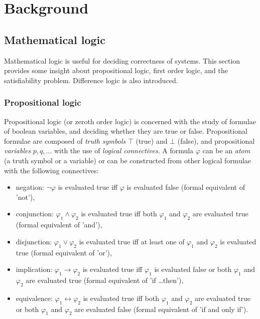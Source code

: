\chapter{Background}
\label{chap:background}


\section{Mathematical logic}

Mathematical logic is useful for deciding correctness of systems. This section provides some insight about propositional logic, first order logic, and the satisfiability problem. Difference logic is also introduced.

\subsection{Propositional logic}

Propositional logic (or zeroth order logic) is concerned with the study of formulae of boolean variables, and deciding whether they are true or false. Propositional formulae are composed of \emph{truth symbols} $\top$ (true) and $\bot$ (false),  and propositional \emph{variables} $p,q, \dots$ with the use of \emph{logical connectives}. A formula $\varphi$ can be an \emph{atom} (a truth symbol or a variable) or can be constructed from other logical formulae with the following connectives:

\begin{itemize}
	\item negation: $\neg\varphi$ is evaluated true iff $\varphi$ is evaluated false (formal equivalent of 'not'),
	\item conjunction: $\varphi_1 \wedge \varphi_2$ is evaluated true iff  both $\varphi_1$ and $\varphi_2$ are evaluated true (formal equivalent of 'and'),
	\item disjunction: $\varphi_1 \vee \varphi_2$ is evaluated true iff  at least one of $\varphi_1$ and $\varphi_2$ is evaluated true (formal equivalent of 'or'),
	\item implication: $\varphi_1 \to \varphi_2$ is evaluated true iff  $\varphi_1$ is evaluated false or both $\varphi_1$ and $\varphi_2$ are evaluated true (formal equivalent of 'if \ldots then'),
	\item equivalence: $\varphi_1 \leftrightarrow \varphi_2$ is evaluated true iff   both $\varphi_1$ and $\varphi_2$ are evaluated true or  both $\varphi_1$ and $\varphi_2$ are evaluated false (formal equivalent of 'if and only if').
\end{itemize}

